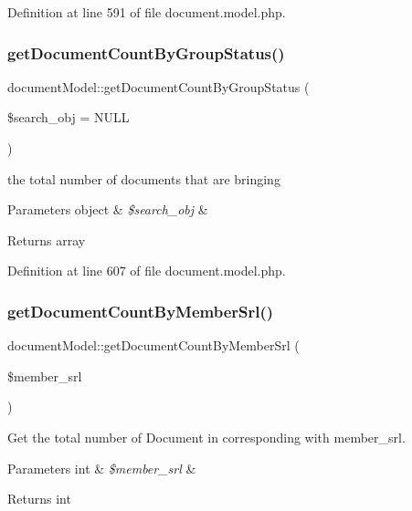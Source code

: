 Definition at line 591 of file document.\+model.\+php.

\mbox{\label{classdocumentModel_a495a49acccae8f20257db40accdffb88}} 
\subsubsection{\texorpdfstring{get\+Document\+Count\+By\+Group\+Status()}{getDocumentCountByGroupStatus()}}
{\footnotesize\ttfamily document\+Model\+::get\+Document\+Count\+By\+Group\+Status (\begin{DoxyParamCaption}\item[{}]{\$search\+\_\+obj = {\ttfamily NULL} }\end{DoxyParamCaption})}

the total number of documents that are bringing 
\begin{DoxyParams}[1]{Parameters}
object & {\em \$search\+\_\+obj} & \\
\hline
\end{DoxyParams}
\begin{DoxyReturn}{Returns}
array 
\end{DoxyReturn}


Definition at line 607 of file document.\+model.\+php.

\mbox{\label{classdocumentModel_aef8741dec5f19c45c98d9d749974c82b}} 
\subsubsection{\texorpdfstring{get\+Document\+Count\+By\+Member\+Srl()}{getDocumentCountByMemberSrl()}}
{\footnotesize\ttfamily document\+Model\+::get\+Document\+Count\+By\+Member\+Srl (\begin{DoxyParamCaption}\item[{}]{\$member\+\_\+srl }\end{DoxyParamCaption})}

Get the total number of Document in corresponding with member\+\_\+srl. 
\begin{DoxyParams}[1]{Parameters}
int & {\em \$member\+\_\+srl} & \\
\hline
\end{DoxyParams}
\begin{DoxyReturn}{Returns}
int 
\end{DoxyReturn}


